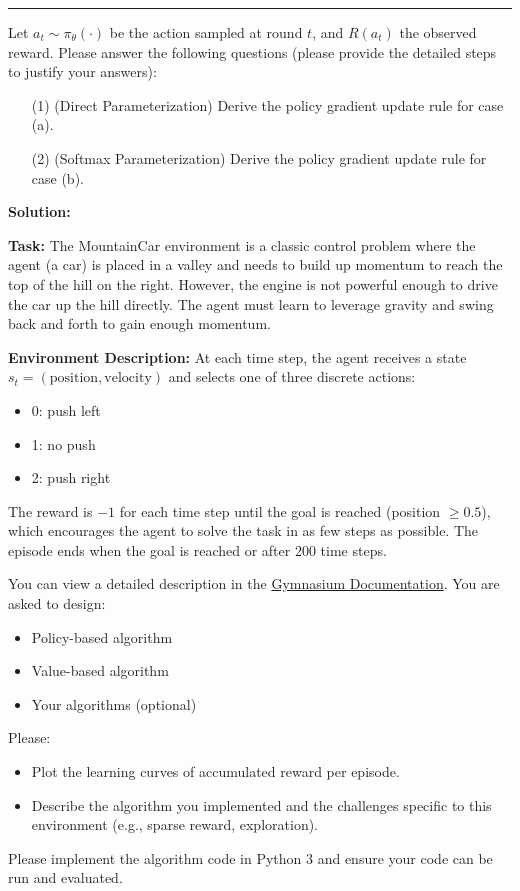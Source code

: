 \documentclass[11pt,oneside,a4paper]{article}
\begin{document}
\vspace{0.02in}
\hrule
\vspace{0.5cm}

\noindent Let $a_t \sim \pi_\theta(\cdot)$ be the action sampled at round $t$, and $R(a_t)$ the observed reward. Please answer the following questions (please provide the detailed steps to justify your answers):
\begin{itemize}
    \item[(1)] (Direct Parameterization) Derive the policy gradient update rule for case (a).
    \item[(2)] (Softmax Parameterization) Derive the policy gradient update rule for case (b).
\end{itemize}

\vspace{0.5cm}
{\noindent \bf Solution:}

\newpage




{\bf Task:}  
The MountainCar environment is a classic control problem where the agent (a car) is placed in a valley and needs to build up momentum to reach the top of the hill on the right. However, the engine is not powerful enough to drive the car up the hill directly. The agent must learn to leverage gravity and swing back and forth to gain enough momentum.

{\bf Environment Description:}  
At each time step, the agent receives a state $s_t = (\text{position}, \text{velocity})$ and selects one of three discrete actions:
\begin{itemize}
    \item 0: push left
    \item 1: no push
    \item 2: push right
\end{itemize}

The reward is $-1$ for each time step until the goal is reached (position $\geq 0.5$), which encourages the agent to solve the task in as few steps as possible. The episode ends when the goal is reached or after 200 time steps.

You can view a detailed description in the \href{https://gymnasium.farama.org/environments/classic_control/mountain_car/}{Gymnasium Documentation}. You are asked to design:
\begin{itemize}
    \item Policy-based algorithm
    \item Value-based algorithm
    \item Your algorithms (optional)
\end{itemize}
Please:
\begin{itemize}
    \item Plot the learning curves of accumulated reward per episode.
    \item Describe the algorithm you implemented and the challenges specific to this environment (e.g., sparse reward, exploration).
\end{itemize}

Please implement the algorithm code in Python $3$ and ensure your code can be run and evaluated.
\end{document}
